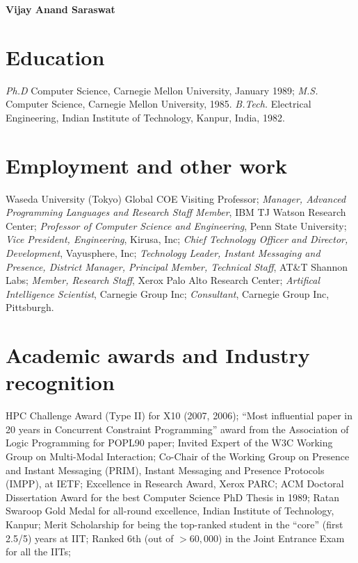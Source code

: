 \documentclass{article}
\begin{document}

\begin{center}
{\bf \sc Vijay Anand Saraswat}\\
\end{center}

\section*{Education}
\textit{Ph.D} Computer Science, Carnegie Mellon University, January 1989;
\textit{M.S.} Computer Science, Carnegie Mellon University, 1985.
\textit{B.Tech.} Electrical Engineering, Indian Institute of Technology,
   Kanpur, India, 1982.

\section*{Employment and other work}

Waseda University (Tokyo) Global COE Visiting Professor; 
\textit{Manager, Advanced Programming Languages and Research Staff Member}, IBM TJ Watson Research Center;
\textit{Professor of Computer Science and Engineering}, Penn State University;
\textit{Vice President, Engineering}, Kirusa, Inc;
\textit{Chief Technology Officer and Director, Development}, Vayusphere, Inc;
\textit{Technology Leader, Instant Messaging and Presence, District Manager, Principal Member, Technical Staff}, AT\&T Shannon Labs; 
\textit{Member, Research Staff}, Xerox Palo Alto Research Center;
\textit{Artifical Intelligence Scientist}, Carnegie Group Inc;
\textit{Consultant}, Carnegie Group Inc, Pittsburgh.

\section*{Academic awards and Industry recognition}

HPC Challenge Award (Type II) for X10 (2007, 2006); 
``Most influential paper in 20 years in Concurrent
Constraint Programming'' award from the Association of Logic
Programming for POPL90 paper;
Invited Expert of the W3C Working Group on Multi-Modal
Interaction; 
Co-Chair of the Working Group on Presence and Instant Messaging
(PRIM), Instant Messaging and Presence Protocols (IMPP), at IETF;
Excellence in Research Award, Xerox PARC;    
ACM Doctoral Dissertation Award for the best Computer Science
PhD Thesis in 1989;
Ratan Swaroop Gold Medal for all-round excellence,
      Indian Institute of Technology, Kanpur; 
Merit Scholarship for being the top-ranked student in the
      ``core'' (first 2.5/5) years  at IIT; 
Ranked 6th (out of $> 60,000$) in the Joint Entrance Exam
      for all the IITs;  
\end{document}
